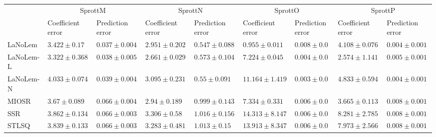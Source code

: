 \begin{table*}
{\begin{tabular}{lllllllll}
 & \multicolumn{2}{c}{SprottM} & \multicolumn{2}{c}{SprottN} & \multicolumn{2}{c}{SprottO} & \multicolumn{2}{c}{SprottP} \\
 & Coefficient error & Prediction error & Coefficient error & Prediction error & Coefficient error & Prediction error & Coefficient error & Prediction error \\
\midrule
LaNoLem & $3.422\pm 0.17$ & $\mathbf{0.037}\pm 0.004$ & $2.951\pm 0.202$ & $\mathbf{0.547}\pm 0.088$ & $\mathbf{0.955}\pm 0.011$ & $0.008\pm 0.0$ & $4.108\pm 0.076$ & $0.004\pm 0.001$ \\
LaNoLem-L & $\mathbf{3.322}\pm 0.368$ & $0.038\pm 0.005$ & $\mathbf{2.661}\pm 0.029$ & $0.573\pm 0.104$ & $7.224\pm 0.045$ & $0.004\pm 0.0$ & $\mathbf{2.574}\pm 1.141$ & $0.005\pm 0.001$ \\
LaNoLem-N & $4.033\pm 0.074$ & $0.039\pm 0.004$ & $3.095\pm 0.231$ & $0.55\pm 0.091$ & $11.164\pm 1.419$ & $\mathbf{0.003}\pm 0.0$ & $4.833\pm 0.594$ & $\mathbf{0.004}\pm 0.001$ \\
MIOSR & $3.67\pm 0.089$ & $0.066\pm 0.004$ & $2.94\pm 0.189$ & $0.999\pm 0.143$ & $7.334\pm 0.331$ & $0.006\pm 0.0$ & $3.665\pm 0.113$ & $0.008\pm 0.001$ \\
SSR & $3.862\pm 0.134$ & $0.066\pm 0.003$ & $3.306\pm 0.58$ & $1.016\pm 0.156$ & $14.313\pm 8.147$ & $0.006\pm 0.0$ & $8.281\pm 2.785$ & $0.008\pm 0.001$ \\
STLSQ & $3.839\pm 0.133$ & $0.066\pm 0.003$ & $3.283\pm 0.481$ & $1.013\pm 0.15$ & $13.913\pm 8.347$ & $0.006\pm 0.0$ & $7.973\pm 2.566$ & $0.008\pm 0.001$ \\

\midrule


\end{tabular}}
\end{table*}
